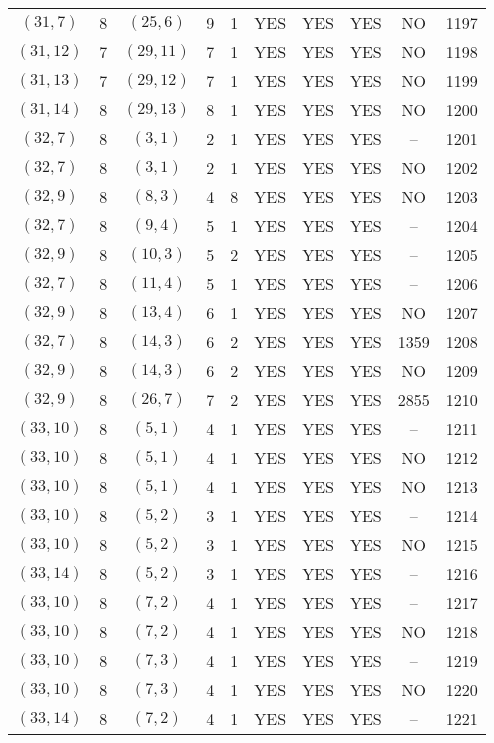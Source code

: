 \begin{longtable}{|c|c|c|c|c|c|c|c|c|c|}
$(31, 7)$ & 8 & $(25, 6)$ & 9 & 1 & YES & YES & YES & NO & 1197\\
$(31, 12)$ & 7 & $(29, 11)$ & 7 & 1 & YES & YES & YES & NO & 1198\\
$(31, 13)$ & 7 & $(29, 12)$ & 7 & 1 & YES & YES & YES & NO & 1199\\
$(31, 14)$ & 8 & $(29, 13)$ & 8 & 1 & YES & YES & YES & NO & 1200\\
$(32, 7)$ & 8 & $(3, 1)$ & 2 & 1 & YES & YES & YES & -- & 1201\\
$(32, 7)$ & 8 & $(3, 1)$ & 2 & 1 & YES & YES & YES & NO & 1202\\
$(32, 9)$ & 8 & $(8, 3)$ & 4 & 8 & YES & YES & YES & NO & 1203\\
$(32, 7)$ & 8 & $(9, 4)$ & 5 & 1 & YES & YES & YES & -- & 1204\\
$(32, 9)$ & 8 & $(10, 3)$ & 5 & 2 & YES & YES & YES & -- & 1205\\
$(32, 7)$ & 8 & $(11, 4)$ & 5 & 1 & YES & YES & YES & -- & 1206\\
$(32, 9)$ & 8 & $(13, 4)$ & 6 & 1 & YES & YES & YES & NO & 1207\\
$(32, 7)$ & 8 & $(14, 3)$ & 6 & 2 & YES & YES & YES & 1359 & 1208\\
$(32, 9)$ & 8 & $(14, 3)$ & 6 & 2 & YES & YES & YES & NO & 1209\\
$(32, 9)$ & 8 & $(26, 7)$ & 7 & 2 & YES & YES & YES & 2855 & 1210\\
$(33, 10)$ & 8 & $(5, 1)$ & 4 & 1 & YES & YES & YES & -- & 1211\\
$(33, 10)$ & 8 & $(5, 1)$ & 4 & 1 & YES & YES & YES & NO & 1212\\
$(33, 10)$ & 8 & $(5, 1)$ & 4 & 1 & YES & YES & YES & NO & 1213\\
$(33, 10)$ & 8 & $(5, 2)$ & 3 & 1 & YES & YES & YES & -- & 1214\\
$(33, 10)$ & 8 & $(5, 2)$ & 3 & 1 & YES & YES & YES & NO & 1215\\
$(33, 14)$ & 8 & $(5, 2)$ & 3 & 1 & YES & YES & YES & -- & 1216\\
$(33, 10)$ & 8 & $(7, 2)$ & 4 & 1 & YES & YES & YES & -- & 1217\\
$(33, 10)$ & 8 & $(7, 2)$ & 4 & 1 & YES & YES & YES & NO & 1218\\
$(33, 10)$ & 8 & $(7, 3)$ & 4 & 1 & YES & YES & YES & -- & 1219\\
$(33, 10)$ & 8 & $(7, 3)$ & 4 & 1 & YES & YES & YES & NO & 1220\\
$(33, 14)$ & 8 & $(7, 2)$ & 4 & 1 & YES & YES & YES & -- & 1221\\

\end{longtable}

